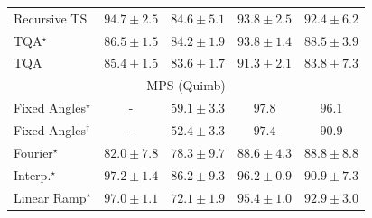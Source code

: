 \begin{tabular}{l|cccc|}
Recursive TS & {\cellcolor[HTML]{6E096A}} \color[HTML]{F1F1F1} $94.7\pm 2.5$ & {\cellcolor[HTML]{8A51A5}} \color[HTML]{F1F1F1} $84.6\pm 5.1$ & {\cellcolor[HTML]{760C71}} \color[HTML]{F1F1F1} $93.8\pm 2.5$ & {\cellcolor[HTML]{81117D}} \color[HTML]{F1F1F1} $92.4\pm 6.2$ \\
TQA$^\star$ & {\cellcolor[HTML]{88449E}} \color[HTML]{F1F1F1} $86.5\pm 1.5$ & {\cellcolor[HTML]{8A55A7}} \color[HTML]{F1F1F1} $84.2\pm 1.9$ & {\cellcolor[HTML]{760C71}} \color[HTML]{F1F1F1} $93.8\pm 1.4$ & {\cellcolor[HTML]{863394}} \color[HTML]{F1F1F1} $88.5\pm 3.9$ \\
TQA & {\cellcolor[HTML]{894CA2}} \color[HTML]{F1F1F1} $85.4\pm 1.5$ & {\cellcolor[HTML]{8A59A8}} \color[HTML]{F1F1F1} $83.6\pm 1.7$ & {\cellcolor[HTML]{831A83}} \color[HTML]{F1F1F1} $91.3\pm 2.1$ & {\cellcolor[HTML]{8A58A8}} \color[HTML]{F1F1F1} $83.8\pm 7.3$ \\
\cline{1-5}
\multicolumn{5}{c}{\rule{0pt}{8pt}MPS (Quimb)} \\
\midrule
Fixed Angles$^\star$ & {\cellcolor[HTML]{000000}} \color[HTML]{F1F1F1} {\cellcolor{white}} \color{black} - & {\cellcolor[HTML]{FFF4B5}} \color[HTML]{000000} $59.1\pm 3.3$ & {\cellcolor[HTML]{6B2606}} \color[HTML]{F1F1F1} $97.8$ & {\cellcolor[HTML]{792B05}} \color[HTML]{F1F1F1} $96.1$ \\
Fixed Angles$^\dagger$ & {\cellcolor[HTML]{000000}} \color[HTML]{F1F1F1} {\cellcolor{white}} \color{black} - & {\cellcolor[HTML]{FFFFE5}} \color[HTML]{000000} $52.4\pm 3.3$ & {\cellcolor[HTML]{6E2706}} \color[HTML]{F1F1F1} $97.4$ & {\cellcolor[HTML]{A83B03}} \color[HTML]{F1F1F1} $90.9$ \\
Fourier$^\star$ & {\cellcolor[HTML]{E76B11}} \color[HTML]{F1F1F1} $82.0\pm 7.8$ & {\cellcolor[HTML]{F5841E}} \color[HTML]{F1F1F1} $78.3\pm 9.7$ & {\cellcolor[HTML]{BC4503}} \color[HTML]{F1F1F1} $88.6\pm 4.3$ & {\cellcolor[HTML]{BB4403}} \color[HTML]{F1F1F1} $88.8\pm 8.8$ \\
Interp.$^\star$ & {\cellcolor[HTML]{702806}} \color[HTML]{F1F1F1} $97.2\pm 1.4$ & {\cellcolor[HTML]{CF5004}} \color[HTML]{F1F1F1} $86.2\pm 9.3$ & {\cellcolor[HTML]{792B05}} \color[HTML]{F1F1F1} $96.2\pm 0.9$ & {\cellcolor[HTML]{A83B03}} \color[HTML]{F1F1F1} $90.9\pm 7.3$ \\
Linear Ramp$^\star$ & {\cellcolor[HTML]{712806}} \color[HTML]{F1F1F1} $97.0\pm 1.1$ & {\cellcolor[HTML]{FEB23F}} \color[HTML]{000000} $72.1\pm 1.9$ & {\cellcolor[HTML]{802D05}} \color[HTML]{F1F1F1} $95.4\pm 1.0$ & {\cellcolor[HTML]{963304}} \color[HTML]{F1F1F1} $92.9\pm 3.0$ \\

\end{tabular}
